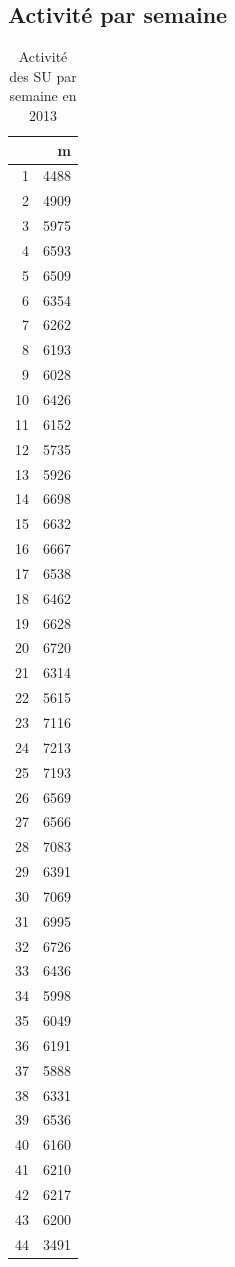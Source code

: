 \documentclass[12pt,english,french,twoside]{report}\usepackage[]{graphicx}\usepackage[]{color}
\begin{document}
\subsection*{Activité par semaine}

\begin{table}[ht]
\centering
\begin{tabular}{rr}
  \hline
 & m \\ 
  \hline
1 & 4488 \\ 
  2 & 4909 \\ 
  3 & 5975 \\ 
  4 & 6593 \\ 
  5 & 6509 \\ 
  6 & 6354 \\ 
  7 & 6262 \\ 
  8 & 6193 \\ 
  9 & 6028 \\ 
  10 & 6426 \\ 
  11 & 6152 \\ 
  12 & 5735 \\ 
  13 & 5926 \\ 
  14 & 6698 \\ 
  15 & 6632 \\ 
  16 & 6667 \\ 
  17 & 6538 \\ 
  18 & 6462 \\ 
  19 & 6628 \\ 
  20 & 6720 \\ 
  21 & 6314 \\ 
  22 & 5615 \\ 
  23 & 7116 \\ 
  24 & 7213 \\ 
  25 & 7193 \\ 
  26 & 6569 \\ 
  27 & 6566 \\ 
  28 & 7083 \\ 
  29 & 6391 \\ 
  30 & 7069 \\ 
  31 & 6995 \\ 
  32 & 6726 \\ 
  33 & 6436 \\ 
  34 & 5998 \\ 
  35 & 6049 \\ 
  36 & 6191 \\ 
  37 & 5888 \\ 
  38 & 6331 \\ 
  39 & 6536 \\ 
  40 & 6160 \\ 
  41 & 6210 \\ 
  42 & 6217 \\ 
  43 & 6200 \\ 
  44 & 3491 \\ 
   \hline
\end{tabular}
\caption[Activité par semaine]{Activité des SU par semaine en 2013} 
\label{act_sem}
\end{table}
\end{document}
